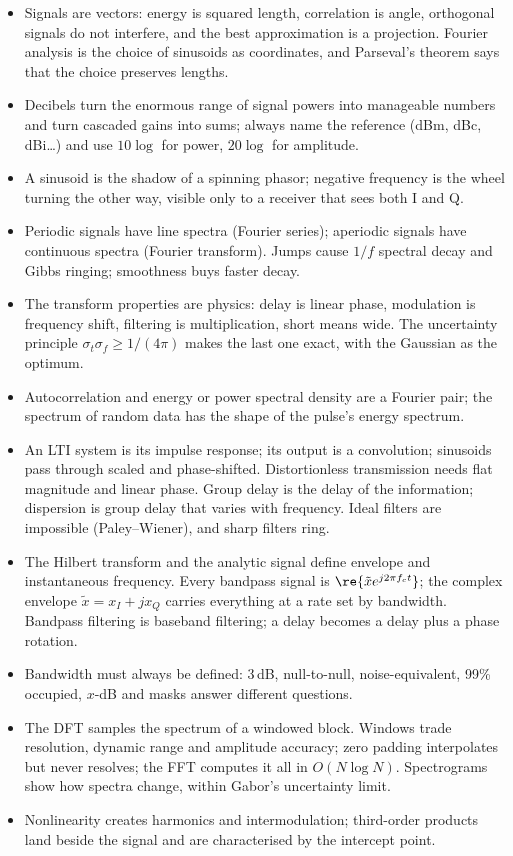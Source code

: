 \begin{itemize}
\item Signals are vectors: energy is squared length, correlation is angle, orthogonal signals do not
interfere, and the best approximation is a projection. Fourier analysis is the choice of sinusoids as
coordinates, and Parseval's theorem says that the choice preserves lengths.
\item Decibels turn the enormous range of signal powers into manageable numbers and turn cascaded
gains into sums; always name the reference (dBm, dBc, dBi\ldots) and use $10\log$ for power, $20\log$
for amplitude.
\item A sinusoid is the shadow of a spinning phasor; negative frequency is the wheel turning the other
way, visible only to a receiver that sees both I and Q.
\item Periodic signals have line spectra (Fourier series); aperiodic signals have continuous spectra
(Fourier transform). Jumps cause $1/f$ spectral decay and Gibbs ringing; smoothness buys faster decay.
\item The transform properties are physics: delay is linear phase, modulation is frequency shift,
filtering is multiplication, short means wide. The uncertainty principle $\sigma_t\sigma_f\ge1/(4\pi)$
makes the last one exact, with the Gaussian as the optimum.
\item Autocorrelation and energy or power spectral density are a Fourier pair; the spectrum of random
data has the shape of the pulse's energy spectrum.
\item An LTI system is its impulse response; its output is a convolution; sinusoids pass through scaled
and phase-shifted. Distortionless transmission needs flat magnitude and linear phase. Group delay is
the delay of the information; dispersion is group delay that varies with frequency. Ideal filters
are impossible (Paley--Wiener), and sharp filters ring.

\item The Hilbert transform and the analytic signal define envelope and instantaneous frequency. Every
bandpass signal is $\re\{\tilde xe^{j2\pi f_ct}\}$; the complex envelope $\tilde x=x_I+jx_Q$ carries
everything at a rate set by bandwidth. Bandpass filtering is baseband filtering; a delay becomes a
delay plus a phase rotation.
\item Bandwidth must always be defined: 3\,dB, null-to-null, noise-equivalent, 99\% occupied, $x$-dB
and masks answer different questions.
\item The DFT samples the spectrum of a windowed block. Windows trade resolution, dynamic range and
amplitude accuracy; zero padding interpolates but never resolves; the FFT computes it all in
$O(N\log N)$. Spectrograms show how spectra change, within Gabor's uncertainty limit.
\item Nonlinearity creates harmonics and intermodulation; third-order products land beside the signal
and are characterised by the intercept point.
\end{itemize}

